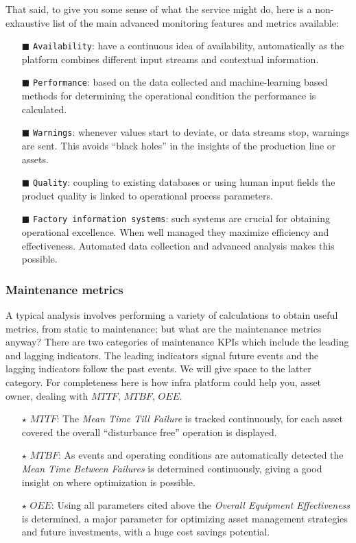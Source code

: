 That said, to give you some sense of what the service might do, here is a non-exhaustive list of the main advanced monitoring features and metrics available:
\begin{enumerate}
	\item[$\blacksquare$]\texttt{Availability}: have a continuous idea of availability, automatically as the platform combines different input streams and contextual information.
	\item[$\blacksquare$]\texttt{Performance}: based on the data collected and machine-learning based methods for determining the operational condition the performance is calculated.
	\item[$\blacksquare$]\texttt{Warnings}: whenever values start to deviate, or data streams stop, warnings are sent. This avoids ``black holes'' in the insights of the production line or assets.
	\item[$\blacksquare$]\texttt{Quality}: coupling to existing databases or using human input fields the product quality is linked to operational process parameters.
	\item[$\blacksquare$]\texttt{Factory information systems}: such systems are crucial for obtaining operational excellence. When well managed they maximize efficiency and effectiveness. Automated data collection and advanced analysis makes this possible.
\end{enumerate}

\subsubsection[short]{Maintenance metrics}
A typical analysis involves performing a variety of calculations to obtain useful metrics, from static to maintenance; but what are the maintenance metrics anyway?
There are two categories of maintenance \ac{KPIs} which include the leading and lagging indicators. The leading indicators signal future events and the lagging indicators follow the past events.
We will give space to the latter category. For completeness here is how \acl{infra} platform could help you, asset owner, dealing with $MTTF$, $MTBF$, $OEE$.
\begin{itemize}
	\item[$\star$] $MTTF$: The \textit{Mean Time Till Failure} is tracked continuously, for each asset covered the overall ``disturbance free'' operation is displayed.
	\item[$\star$] $MTBF$: As events and operating conditions are automatically detected the \textit{Mean Time Between Failures} is determined continuously, giving a good insight on where optimization is possible.
	\item[$\star$] $OEE$: Using all parameters cited above the \textit{Overall Equipment Effectiveness} is determined, a major parameter for optimizing asset management strategies and future investments, with a huge cost savings potential.
\end{itemize}